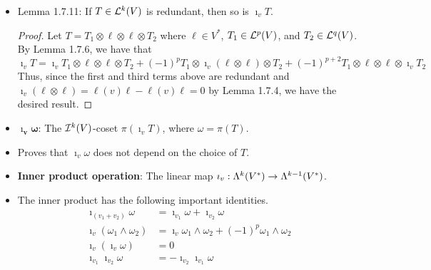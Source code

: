 \documentclass[../notes.tex]{subfiles}
\begin{document}
\begin{itemize}
\begin{proof}
        \begin{align*}
            0 &= \imath_v\imath_v\tag*{Lemma 1.7.8}\\
            &= (\imath_{v_1}+\imath_{v_2})(\imath_{v_1}+\imath_{v_2})\\
            &= \imath_{v_1}\imath_{v_1}+\imath_{v_1}\imath_{v_2}+\imath_{v_2}\imath_{v_1}+\imath_{v_2}\imath_{v_2}\\
            &= \imath_{v_1}\imath_{v_2}+\imath_{v_2}\imath_{v_1}\tag*{Lemma 1.7.8}
        \end{align*}
        yielding the desired result.
    \end{proof}
    \item Lemma 1.7.11: If $T\in\lin[k]{V}$ is redundant, then so is $\imath_vT$.
    \begin{proof}
        Let $T=T_1\otimes\ell\otimes\ell\otimes T_2$ where $\ell\in V^*$, $T_1\in\lin[p]{V}$, and $T_2\in\lin[q]{V}$. By Lemma 1.7.6, we have that
        \begin{equation*}
            \imath_vT = \imath_vT_1\otimes\ell\otimes\ell\otimes T_2+(-1)^pT_1\otimes\imath_v(\ell\otimes\ell)\otimes T_2+(-1)^{p+2}T_1\otimes\ell\otimes\ell\otimes\imath_vT_2
        \end{equation*}
        Thus, since the first and third terms above are redundant and $\imath_v(\ell\otimes\ell)=\ell(v)\ell-\ell(v)\ell=0$ by Lemma 1.7.4, we have the desired result.
    \end{proof}
    \item $\bm{\imath_v\omega}$: The $\ide[k]{V}$-coset $\pi(\imath_vT)$, where $\omega=\pi(T)$.
    \item Proves that $\imath_v\omega$ does not depend on the choice of $T$.
    \item \textbf{Inner product operation}: The linear map $\imath_v:\lam[k]{V^*}\to\lam[k-1]{V^*}$.
    \item The inner product has the following important identities.
    \begin{align*}
        \imath_{(v_1+v_2)}\omega &= \imath_{v_1}\omega+\imath_{v_2}\omega\\
        \imath_v(\omega_1\wedge\omega_2) &= \imath_v\omega_1\wedge\omega_2+(-1)^p\omega_1\wedge\omega_2\\
        \imath_v(\imath_v\omega) &= 0\\
        \imath_{v_1}\imath_{v_2}\omega &= -\imath_{v_2}\imath_{v_1}\omega
    \end{align*}
\end{itemize}
\end{document}

